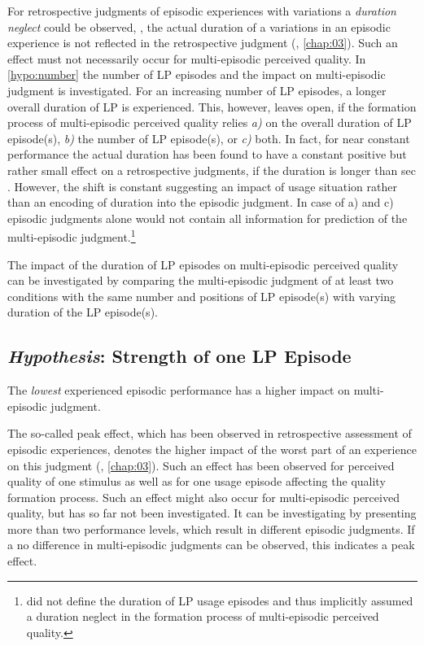 For retrospective judgments of episodic experiences with variations a \emph{duration neglect} could be observed, \ie, the actual duration of a variations in an episodic experience is not reflected in the retrospective judgment (\cf, \autoref{chap:03}).
Such an effect must not necessarily occur for multi-episodic perceived quality.
In \autoref{hypo:number} the number of \ac{LP} episodes and the impact on multi-episodic judgment is investigated.
For an increasing number of \ac{LP} episodes, a longer overall duration of \ac{LP} is experienced.
This, however, leaves open, if the formation process of multi-episodic perceived quality relies \emph{a)} on the overall duration of \ac{LP} episode(s), \emph{b)} the number of \ac{LP} episode(s), or \emph{c)} both.
In fact, for near constant performance the actual duration has been found to have a constant positive but rather small effect on a retrospective judgments, if the duration is longer than \unit[30]{sec} \citep[\cf,][]{frohlich_qoe_2012}.
However, the shift is constant suggesting an impact of usage situation rather than an encoding of duration into the episodic judgment.
In case of a) and c) episodic judgments alone would not contain all information for prediction of the multi-episodic judgment.\footnote{\citet[p. 2]{moller_single-call_2011} did not define the duration of \ac{LP} usage episodes and thus implicitly assumed a duration neglect in the formation process of multi-episodic perceived quality.}

The impact of the duration of \ac{LP} episodes on multi-episodic perceived quality can be investigated by comparing the multi-episodic judgment of at least two conditions with the same number and positions of \ac{LP} episode(s) with varying duration of the \ac{LP} episode(s).

\subsection{\emph{Hypothesis}: Strength of one \acs{LP} Episode}
\begin{hypothesis}\label{hypo:strength}
The \emph{lowest} experienced episodic performance has a higher impact on multi-episodic judgment.
\end{hypothesis}

The so-called peak effect, which has been observed in retrospective assessment of episodic experiences, denotes the higher impact of the worst part of an experience on this judgment (\cf, \autoref{chap:03}).
Such an effect has been observed for perceived quality of one stimulus as well as for one usage episode affecting the quality formation process.
Such an effect might also occur for multi-episodic perceived quality, but has so far not been investigated.
It can be investigating by presenting more than two performance levels, which result in different episodic judgments.
If a no difference in multi-episodic judgments can be observed, this indicates a peak effect.

